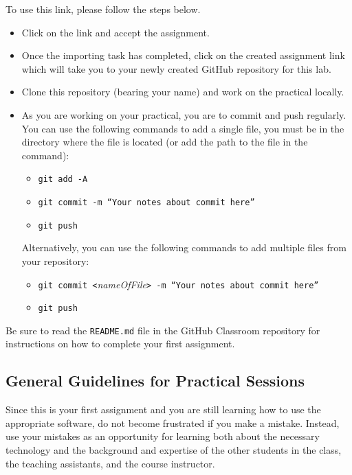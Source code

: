 To use this link, please follow the steps below.
\begin{itemize}
	\item Click on the link and accept the assignment.
	\item Once the importing task has completed, click on the created assignment link which will take you to your newly created GitHub repository for this lab.
	\item Clone this repository (bearing your name) and work on the practical locally.
	\item As you are working on your practical, you are to commit and push regularly. You can use the following commands to add a single file, you must be in the directory where the file is located (or add the path to the file in the command):
		\begin{itemize}
		\item {\tt git add -A}
		\item {\tt git commit -m ``Your notes about commit here''}
		\item {\tt git push}
	\end{itemize}

	Alternatively, you can use the following commands to add multiple files from your repository:
	\begin{itemize}
		\item {\tt git commit <}\emph{nameOfFile}\tt{> -m ``Your notes about commit here''}
		\item {\tt git push}
	\end{itemize}
\end{itemize}

Be sure to read the {\tt README.md} file in the GitHub Classroom repository for instructions on how to complete your first assignment.


\subsection*{General Guidelines for Practical Sessions}

\noindent Since this is your first assignment and you are still learning how to use the appropriate software, do not become frustrated if you make a mistake. Instead, use your mistakes as an opportunity for learning both about the necessary technology and the background and expertise of the other students in the class, the teaching assistants, and the course instructor. %
    
